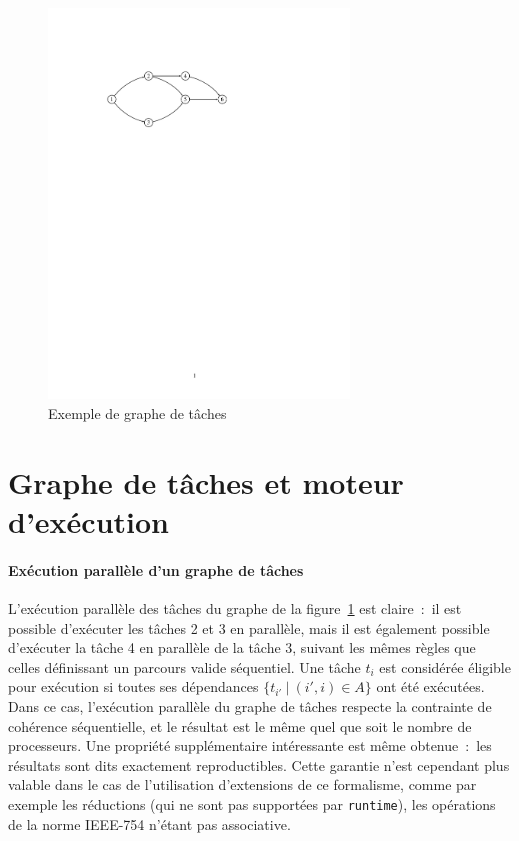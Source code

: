\documentclass[11pt]{article}
\theoremstyle{plain} %
\theoremstyle{definition} %
\begin{document}
\begin{figure}[!htpb]
  \centering
  \includegraphics[width=8cm]{figures/dag_exemple.pdf}
  \caption{Exemple de graphe de tâches}
  \label{fig:exemple-dag}
\end{figure}

\section{Graphe de tâches et moteur d'exécution}
\label{sec:graphes-de-tache}

\paragraph{Exécution parallèle d'un graphe de tâches}
\label{sec:exec-parall-dun}
L'exécution parallèle des tâches du graphe de la figure~\ref{fig:exemple-dag} est claire~:~il est possible d'exécuter les tâches 2 et 3 en parallèle, mais il est également possible d'exécuter la tâche 4 en parallèle de la tâche 3, suivant les mêmes règles que celles définissant un parcours valide séquentiel.
Une tâche $t_i$ est considérée éligible pour exécution si toutes ses dépendances $\{t_{i'} \ |\ (i', i) \in A\}$ ont été exécutées.
Dans ce cas, l'exécution parallèle du graphe de tâches respecte la contrainte de cohérence séquentielle, et le résultat est le même quel que soit le nombre de processeurs.
Une propriété supplémentaire intéressante est même obtenue~:~les résultats sont dits exactement reproductibles.
Cette garantie n'est cependant plus valable dans le cas de l'utilisation d'extensions de ce formalisme, comme par exemple les réductions (qui ne sont pas supportées par \texttt{runtime}), les opérations de la norme IEEE-754 n'étant pas associative.
\end{document}

